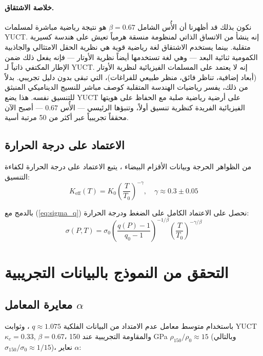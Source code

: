 \documentclass[12pt,a4paper]{article}
\newcommand{\kappac}{\kappa_c}
\newcommand{\Ke}{K_{\mathrm{eff}}}
\newcommand{\alp}{\alpha}
\theoremstyle{remark}
\begin{document}
	\paragraph{خلاصة الاشتقاق.}
	نكون بذلك قد أظهرنا أن الأُس الشامل \(\beta = 0.67\) هو نتيجة رياضية مباشرة لمسلمات YUCT. إنه ينشأ من الاتساق الذاتي لمنظومة منسقة هرمياً تعيش على هندسة كسيرية متقلبة. بينما يستخدم الاشتقاق لغة رياضية قوية هي نظرية الحقل الامتثالي والجاذبية الكمومية ثنائية البعد — وهي لغة تستخدمها أيضاً نظرية الأوتار — فإنه يفعل ذلك ضمن الإطار المكتفي ذاتياً لـ YUCT. إنه لا يعتمد على المسلمات الفيزيائية لنظرية الأوتار (أبعاد إضافية، تناظر فائق، منظر طبيعي للفراغات)، التي تبقى بدون دليل تجريبي. بدلاً من ذلك، يفسر رياضيات الهندسة المتقلبة كوصف مباشر للنسيج الديناميكي المنبثق للتنسيق نفسه. هذا يضع YUCT على أرضية رياضية صلبة مع الحفاظ على هويتها الفيزيائية الفريدة كنظرية تنسيق أولاً، وتنبؤها الرئيسي — الأُس \(0.67\) — أصبح الآن محققاً تجريبياً عبر أكثر من 50 مرتبة أسية.
	
	\subsection{الاعتماد على درجة الحرارة}
	
	من الظواهر الحرجة وبيانات الأقزام البيضاء \cite{appendixP}، يتبع الاعتماد على درجة الحرارة لكفاءة التنسيق:
	\begin{equation}
		\Ke(T) = K_0 \left( \frac{T}{T_0} \right)^{-\gamma}, \quad \gamma \approx 0.3 \pm 0.05
		\label{eq:keff_temp}
	\end{equation}
	
	بالدمج مع (\ref{eq:sigma_q}) نحصل على الاعتماد الكامل على الضغط ودرجة الحرارة:
	\begin{equation}
		\sigma(P,T) = \sigma_0 \left( \frac{q(P)-1}{q_0-1} \right)^{-1/\beta} \left( \frac{T}{T_0} \right)^{-\gamma/\beta}
		\label{eq:sigma_PT}
	\end{equation}
	
	\section{التحقق من النموذج بالبيانات التجريبية}
	
	\subsection{معايرة المعامل \(\alp\)}
	
	باستخدام متوسط معامل عدم الامتداد من البيانات الفلكية \(q \approx 1.075\) \cite{bertulani2015}، وثوابت YUCT \(\kappac = 0.33\), \(\beta = 0.67\)، والمقاومة التجريبية عند 150 GPa \(\rho_{150}/\rho_0 \approx 15\) (وبالتالي \(\sigma_{150}/\sigma_0 \approx 1/15\))، نعاير \(\alp\):
	
\end{document}
